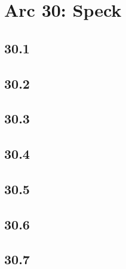 \part{Arc 30: Speck}
 \chapter{30.1}
 \chapter{30.2}
 \chapter{30.3}
 \chapter{30.4}
 \chapter{30.5}
 \chapter{30.6}
 \chapter{30.7}








